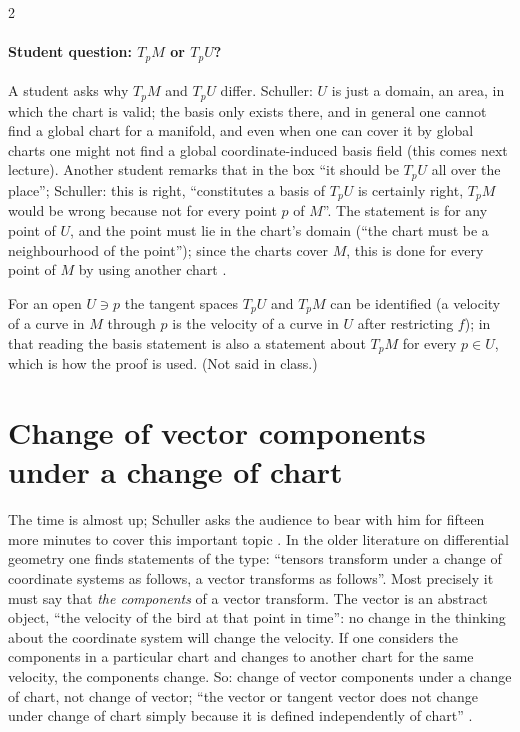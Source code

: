 \begin{paracol}{2}
\paragraph{Student question: $T_pM$ or $T_pU$?} A student asks why $T_pM$ and $T_pU$ differ. Schuller: $U$ is just a domain, an area, in which the chart is valid; the basis only exists there, and in general one cannot find a global chart for a manifold, and even when one can cover it by global charts one might not find a global coordinate-induced basis field (this comes next lecture). Another student remarks that in the box ``it should be $T_pU$ all over the place'';
Schuller: this is right, ``constitutes a basis of $T_pU$ is certainly right, $T_pM$ would be wrong because not for every point $p$ of $M$''. The statement is for any point of $U$, and the point must lie in the chart's domain (``the chart must be a neighbourhood of the point''); since the charts cover $M$, this is done for every point of $M$ by using another chart .
\begin{coursenote}[$T_pU=T_pM$]
For an open $U\ni p$ the tangent spaces $T_pU$ and $T_pM$ can be identified (a velocity of a curve in $M$ through $p$ is the velocity of a curve in $U$ after restricting $f$); in that reading the basis statement is also a statement about $T_pM$ for every $p\in U$, which is how the proof is used. (Not said in class.)
\end{coursenote}

\section{Change of vector components under a change of chart}\label{sec:c05-change}

The time is almost up; Schuller asks the audience to bear with him for fifteen more minutes to cover this important topic . In the older literature on differential geometry one finds statements of the type: ``tensors transform under a change of coordinate systems as follows, a vector transforms as follows''. Most precisely it must say that \emph{the components} of a vector transform. The vector is an abstract object, ``the velocity of the bird at that point in time'':
no change in the thinking about the coordinate system will change the velocity. If one considers the components in a particular chart and changes to another chart for the same velocity, the components change. So: change of vector components under a change of chart, not change of vector; ``the vector or tangent vector does not change under change of chart simply because it is defined independently of chart''
.


\end{paracol}
